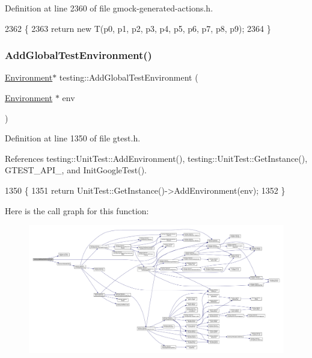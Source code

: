 Definition at line 2360 of file gmock-\/generated-\/actions.\+h.


\begin{DoxyCode}
2362                                                                              \{
2363   \textcolor{keywordflow}{return} \textcolor{keyword}{new} T(p0, p1, p2, p3, p4, p5, p6, p7, p8, p9);
2364 \}
\end{DoxyCode}
\mbox{\label{namespacetesting_a460d7b998622e332392c1e00be3a60d5}} 
\subsubsection{\texorpdfstring{Add\+Global\+Test\+Environment()}{AddGlobalTestEnvironment()}}
{\footnotesize\ttfamily \hyperlink{classtesting_1_1Environment}{Environment}$\ast$ testing\+::\+Add\+Global\+Test\+Environment (\begin{DoxyParamCaption}\item[{\hyperlink{classtesting_1_1Environment}{Environment} $\ast$}]{env }\end{DoxyParamCaption})\hspace{0.3cm}{\ttfamily [inline]}}



Definition at line 1350 of file gtest.\+h.



References testing\+::\+Unit\+Test\+::\+Add\+Environment(), testing\+::\+Unit\+Test\+::\+Get\+Instance(), G\+T\+E\+S\+T\+\_\+\+A\+P\+I\+\_\+, and Init\+Google\+Test().


\begin{DoxyCode}
1350                                                                \{
1351   \textcolor{keywordflow}{return} UnitTest::GetInstance()->AddEnvironment(env);
1352 \}
\end{DoxyCode}
Here is the call graph for this function\+:
\nopagebreak
\begin{figure}[H]
\begin{center}
\leavevmode
\includegraphics[width=350pt]{namespacetesting_a460d7b998622e332392c1e00be3a60d5_cgraph}
\end{center}
\end{figure}
\mbox{\label{namespacetesting_a2522e94b71f88fbfbbcf6942cd0c6ee0}} 
